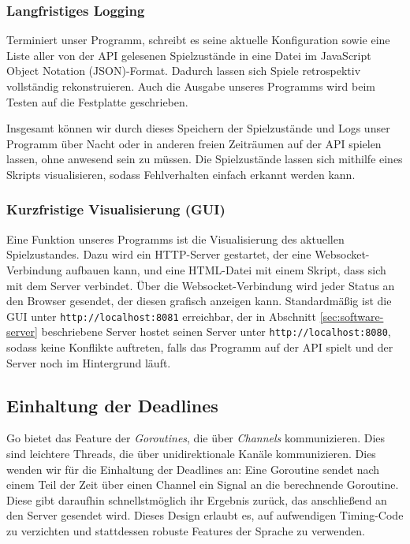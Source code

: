 \documentclass[12pt,a4paper]{article}
\begin{document}
\subsubsection{Langfristiges Logging}
Terminiert unser Programm, schreibt es seine aktuelle Konfiguration sowie eine Liste aller von der API gelesenen Spielzustände in eine Datei im JavaScript Object Notation (JSON)-Format. Dadurch lassen sich Spiele retrospektiv vollständig rekonstruieren.
Auch die Ausgabe unseres Programms wird beim Testen auf die Festplatte geschrieben.

Insgesamt können wir durch dieses Speichern der Spielzustände und Logs unser Programm über Nacht oder in anderen freien Zeiträumen auf der API spielen lassen, ohne anwesend sein zu müssen.
Die Spielzustände lassen sich mithilfe eines Skripts visualisieren, sodass Fehlverhalten einfach erkannt werden kann.

\subsubsection{Kurzfristige Visualisierung (GUI)} \label{sec:software-gui}
Eine Funktion unseres Programms ist die Visualisierung des aktuellen Spielzustandes. Dazu wird ein HTTP-Server gestartet, der eine Websocket-Verbindung aufbauen kann, und eine HTML-Datei mit einem Skript, dass sich mit dem Server verbindet. Über die Websocket-Verbindung wird jeder Status an den Browser gesendet, der diesen grafisch anzeigen kann. Standardmäßig ist die GUI unter \texttt{http://localhost:8081} erreichbar, der in Abschnitt \ref{sec:software-server} beschriebene Server hostet seinen Server unter \texttt{http://localhost:8080}, sodass keine Konflikte auftreten, falls das Programm auf der API spielt und der Server noch im Hintergrund läuft.

\subsection{Einhaltung der Deadlines}
Go bietet das Feature der \textit{Goroutines}, die über \textit{Channels} kommunizieren. Dies sind leichtere Threads, die über unidirektionale Kanäle kommunizieren. Dies wenden wir für die Einhaltung der Deadlines an: Eine Goroutine sendet nach einem Teil der Zeit über einen Channel ein Signal an die berechnende Goroutine. Diese gibt daraufhin schnellstmöglich ihr Ergebnis zurück, das anschließend an den Server gesendet wird. Dieses Design erlaubt es, auf aufwendigen Timing-Code zu verzichten und stattdessen robuste Features der Sprache zu verwenden.
\end{document}
